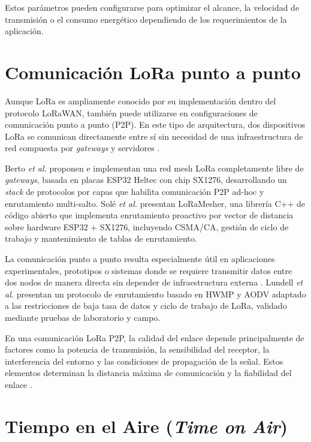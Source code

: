 Estos parámetros pueden configurarse para optimizar el alcance, la velocidad de transmisión o el consumo energético dependiendo de los requerimientos de la aplicación.

\section{Comunicación LoRa punto a punto}
\label{sec:p2p}

Aunque LoRa es ampliamente conocido por su implementación dentro del protocolo LoRaWAN, también puede utilizarse en configuraciones de comunicación punto a punto (P2P). En este tipo de arquitectura, dos dispositivos LoRa se comunican directamente entre sí sin necesidad de una infraestructura de red compuesta por \textit{gateways} y servidores \cite{berto2021mesh}.

Berto \textit{et al.} \cite{berto2021mesh} proponen e implementan una red mesh LoRa completamente libre de \textit{gateways}, basada en placas ESP32 Heltec con chip SX1276, desarrollando un \textit{stack} de protocolos por capas que habilita comunicación P2P ad-hoc y enrutamiento multi-salto. Solé \textit{et al.} \cite{sole2022loramesher} presentan LoRaMesher, una librería C++ de código abierto que implementa enrutamiento proactivo por vector de distancia sobre hardware ESP32 + SX1276, incluyendo CSMA/CA, gestión de ciclo de trabajo y mantenimiento de tablas de enrutamiento.

La comunicación punto a punto resulta especialmente útil en aplicaciones experimentales, prototipos o sistemas donde se requiere transmitir datos entre dos nodos de manera directa sin depender de infraestructura externa \cite{huh2019mesh}. Lundell \textit{et al.} \cite{lundell2018routing} presentan un protocolo de enrutamiento basado en HWMP y AODV adaptado a las restricciones de baja tasa de datos y ciclo de trabajo de LoRa, validado mediante pruebas de laboratorio y campo.

En una comunicación LoRa P2P, la calidad del enlace depende principalmente de factores como la potencia de transmisión, la sensibilidad del receptor, la interferencia del entorno y las condiciones de propagación de la señal. Estos elementos determinan la distancia máxima de comunicación y la fiabilidad del enlace \cite{augustin2016study}.

\section{Tiempo en el Aire (\textit{Time on Air})}
\label{sec:toa}

